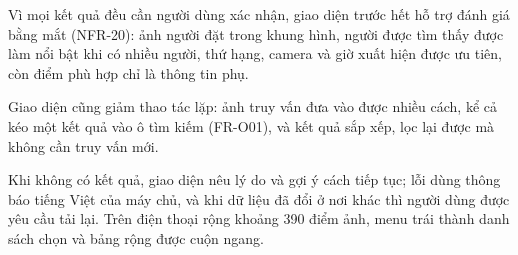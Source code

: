 Vì mọi kết quả đều cần người dùng xác nhận, giao diện trước hết hỗ trợ đánh giá bằng mắt (NFR-20): ảnh người đặt trong khung hình, người được tìm thấy được làm nổi bật khi có nhiều người, thứ hạng, camera và giờ xuất hiện được ưu tiên, còn điểm phù hợp chỉ là thông tin phụ.

Giao diện cũng giảm thao tác lặp: ảnh truy vấn đưa vào được nhiều cách, kể cả kéo một kết quả vào ô tìm kiếm (FR-O01), và kết quả sắp xếp, lọc lại được mà không cần truy vấn mới.

Khi không có kết quả, giao diện nêu lý do và gợi ý cách tiếp tục; lỗi dùng thông báo tiếng Việt của máy chủ, và khi dữ liệu đã đổi ở nơi khác thì người dùng được yêu cầu tải lại. Trên điện thoại rộng khoảng 390 điểm ảnh, menu trái thành danh sách chọn và bảng rộng được cuộn ngang.
